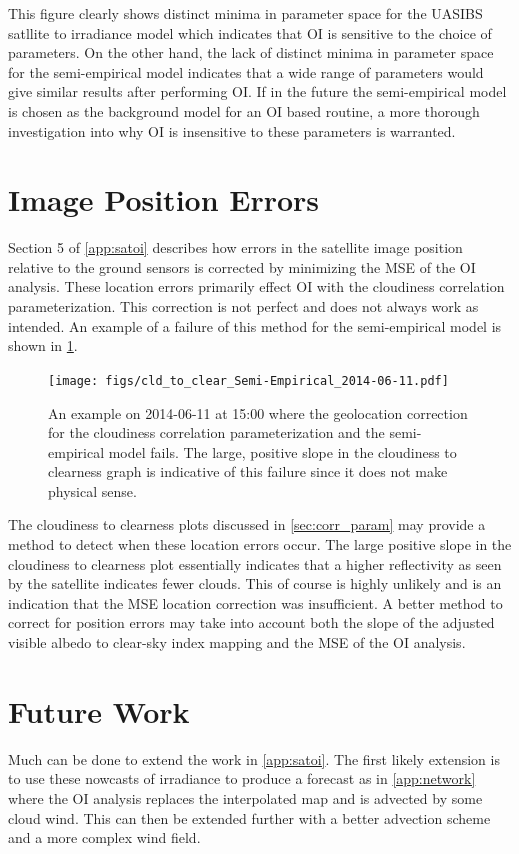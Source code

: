 This figure clearly shows distinct minima in parameter space for the
UASIBS satllite to irradiance model which indicates that  OI is
sensitive to the choice of parameters.
On the other hand, the lack of distinct minima in parameter space for
the semi-empirical model indicates that a wide range of parameters would
give similar results after performing OI.
If in the future the semi-empirical model is chosen as the background model
for an OI based routine, a more thorough investigation into why OI is
insensitive to these parameters is warranted.


\section{Image Position Errors}
Section 5 of \cref{app:satoi} describes how errors in the satellite
image position relative to the ground sensors is corrected by
minimizing the MSE of the OI analysis.
These location errors primarily effect OI with the cloudiness
correlation parameterization.
This correction is not perfect and does not always work as intended.
An example of a failure of this method for the semi-empirical model is
shown in \cref{fig:parallax_err}.


\begin{figure}[p]
\centering
\texttt{[image: figs/cld\_to\_clear\_Semi-Empirical\_2014-06-11.pdf]}
\caption[An example of a failure of the geolocation correction]{
  An example on 2014-06-11 at 15:00 where the geolocation correction
  for the cloudiness correlation parameterization and the
  semi-empirical model fails. The large, positive slope in the
  cloudiness to clearness graph is indicative of this failure since it
  does not make physical sense.}
\label{fig:parallax_err}
\end{figure}

The cloudiness to clearness plots discussed in \cref{sec:corr_param}
may provide a method to detect when these location errors occur.
The large positive slope in the cloudiness to clearness plot
essentially indicates that a higher reflectivity as seen by the
satellite indicates fewer clouds.
This of course is highly unlikely and is an indication that the MSE
location correction was insufficient.
A better method to correct for position errors may take into account
both the slope of the adjusted visible albedo to clear-sky index
mapping and the MSE of the OI analysis.

\section{Future Work}
Much can be done to extend the work in \cref{app:satoi}.
The first likely extension is to use these nowcasts of irradiance to
produce a forecast as in \cref{app:network} where the OI analysis
replaces the interpolated map and is advected by some cloud wind.
This can then be extended further with a better advection scheme and
a more complex wind field.

